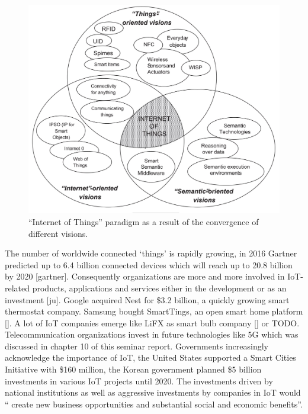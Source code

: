   \begin{figure}[h]
    \begin{center}
    \includegraphics[scale=0.35]{Talk11/iot_visions.jpg}
    \end{center}
    \caption{``Internet of Things'' paradigm as a result of the convergence of different visions.}
    \label{``Internet of Things'' visions}
  \end{figure}

The number of worldwide connected `things' is rapidly growing, in 2016 Gartner predicted up to 6.4 billion connected devices which will reach up to 20.8 billion by 2020 [gartner]. Consequently organizations are more and more involved in IoT-related products, applications and services either in the development or as an investment [ju]. Google acquired Nest for \$3.2 billion, a quickly growing smart thermostat company. Samsung bought SmartTings, an open smart home platform []. A lot of IoT companies emerge like LiFX as smart bulb company [] or TODO. Telecommunication organizations invest in future technologies like 5G which was discussed in chapter 10 of this seminar report. Governments increasingly acknowledge the importance of IoT, the United States supported a Smart Cities Initiative with \$160 million, the Korean government planned \$5 billion investments in various IoT projects until 2020. The investments driven by national institutions as well as aggressive investments by companies in IoT would `` create new business opportunities and substantial social and economic benefits''. 

